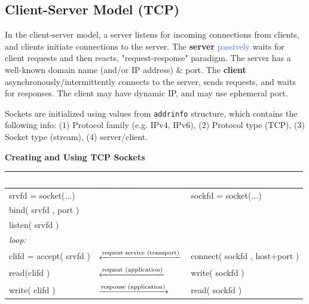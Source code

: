 \documentclass[openany,12pt]{book}
\newcommand{\code}[1]{\texttt{#1}}
\newcommand{\red}[1]{\textcolor{Red}{#1}}
\newcommand{\blue}[1]{\textcolor{RoyalBlue}{#1}}
\begin{document}
\subsection*{Client-Server Model (TCP)}
In the client-server model, a server listens for incoming connections from clients, and clients initiate connections to the server. The \textbf{server} \blue{passively} waits for client requests and then reacts, "request-response" paradigm. The server has a well-known domain name (and/or IP address) \& port. The \textbf{client} asynchronously/intermittently connects to the server, sends requests, and waits for responses. The client may have dynamic IP, and may use ephemeral port.

Sockets are initialized using values from \code{addrinfo} structure, which contains the following info: (1) Protocol family (e.g. IPv4, IPv6), (2) Protocol type (TCP), (3) Socket type (stream), (4) server/client.


\begin{samepage}
  \begin{center}
    \textbf{Creating and Using TCP Sockets}
    \begin{tabular}{|>{\raggedright\arraybackslash\ttfamily}p{4cm}|
                     >{\centering\arraybackslash}p{5.5cm}|
                     >{\raggedright\arraybackslash\ttfamily}p{4cm}|}
      \hline
      \rowcolor{blue!50}
      \textcolor{white}{\textbf{server}} &
      \textcolor{white}{\textbf{message}} &
      \textcolor{white}{\textbf{client}} \\
      \hline
      srvfd = socket(...) & & sockfd = socket(...) \\
      
      bind( srvfd , port ) & & \\
      
      listen( srvfd ) & & \\
      
      \normalfont\textit{loop:} & & \\
      
      clifd = accept( srvfd ) &
      \red{$\xleftarrow{\text{\textcolor{black}{request service (transport)}}}$ } &
      connect( sockfd , host+port ) \\
      
      read(clifd ) &
      \red{$\xleftarrow{\text{\textcolor{black}{request (application)}}}$ } &
      write( sockfd ) \\
      
      write( clifd ) &
      \red{$\xrightarrow{\text{\textcolor{black}{response (application)}}}$ } &
      read( sockfd ) \\
      \hline
    \end{tabular}
  \end{center}
\end{samepage}
\end{document}
